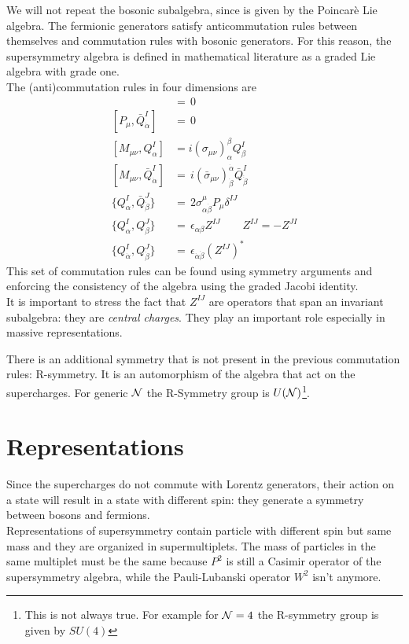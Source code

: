 \begin{appendices}
We will not repeat the bosonic subalgebra, since is given by the Poincarè Lie algebra.
The fermionic generators satisfy anticommutation rules between themselves and commutation rules with bosonic generators.
For this reason, the supersymmetry algebra is defined in mathematical literature as a graded Lie algebra with grade one. 
\\
The (anti)commutation rules in four dimensions are
\begin{align}
	[P_{\mu}, Q_{\alpha}^I ] & = \, 0 \\
	[P_{\mu}, \bar{Q}_{\dot{\alpha}}^I ] & = \, 0 \\
	[M_{\mu \nu}, Q_{\alpha}^I] & = i (\sigma_{\mu \nu})_{\alpha}^{\beta} Q_{\beta}^I \\
	[M_{\mu \nu}, \bar{Q}_{\dot{\alpha}}^I ] & = \, i (\bar{\sigma}_{\mu \nu})^{\dot{\alpha}}_{\dot{\beta}} \bar{Q}_{\dot{\dot{\beta}}}^I \\
	\{ Q_{\alpha}^I ,\bar{Q}_{\dot{\beta}}^J \}  & = \, 2 \sigma^\mu_{ \alpha \dot{\beta}} P_{\mu} \delta^{IJ} \\ 
	\{Q_{\alpha}^I, Q_{\beta}^J \} & = \, \epsilon_{\alpha \beta} Z^{I J } \qquad Z^{IJ} = - Z^{JI} \\
	\{Q_{\dot{\alpha}}^I, Q_{\dot{\beta}}^J \} & = \, \epsilon_{\dot{\alpha} \dot{\beta}} \left( Z^{I J } \right)^* 
\end{align}
This set of commutation rules can be found using symmetry arguments and enforcing the consistency of the algebra using the graded Jacobi identity.\\
It is important to stress the fact that $Z^{IJ}$ are operators that span an invariant subalgebra: they are \emph{central charges}.
They play an important role especially in massive representations.

There is an additional symmetry that is not present in the previous commutation rules: R-symmetry.
It is an automorphism of the algebra that act on the supercharges.
For generic $\mathcal{N}$ the R-Symmetry group is  $U(\mathcal{N})$\footnote{This is not always true. For example for $\mathcal{N}=4$ the R-symmetry group is given by $SU(4)$}.









\section{Representations}
Since the supercharges do not commute with Lorentz generators, their action on a state will result in a state with different spin: they generate a symmetry between bosons and fermions.\\
Representations of supersymmetry contain particle with different spin but same mass and they are organized in supermultiplets.
The mass of particles in the same multiplet must be the same because $P^2$ is still a Casimir operator of the supersymmetry algebra, while the Pauli-Lubanski operator $W^2$ isn't anymore.  


\end{appendices}
